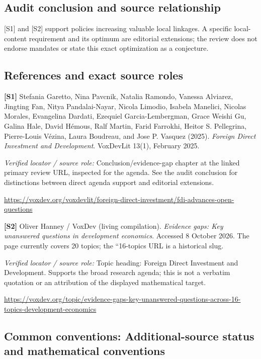 \documentclass[11pt,a4paper]{article}
\begin{document}
\subsection*{Audit conclusion and source relationship}

[S1] and [S2] support policies increasing valuable local linkages. A specific local-content requirement and its optimum are editorial extensions; the review does not endorse mandates or state this exact optimization as a conjecture.

\subsection*{References and exact source roles}

{\footnotesize\raggedright
\par\noindent\textbf{[S1]} Stefania Garetto, Nina Pavcnik, Natalia Ramondo, Vanessa Alviarez, Jingting Fan, Nitya Pandalai-Nayar, Nicola Limodio, Isabela Manelici, Nicolas Morales, Evangelina Dardati, Ezequiel Garcia-Lembergman, Grace Weishi Gu, Galina Hale, David Hémous, Ralf Martin, Farid Farrokhi, Heitor S. Pellegrina, Pierre-Louis Vézina, Laura Boudreau, and Jose P. Vasquez (2025). \emph{Foreign Direct Investment and Development}. VoxDevLit 13(1), February 2025.\par \textit{Verified locator / source role:} Conclusion/evidence-gap chapter at the linked primary review URL, inspected for the agenda. See the audit conclusion for distinctions between direct agenda support and editorial extensions.\par \url{https://voxdev.org/voxdevlit/foreign-direct-investment/fdi-advances-open-questions}\par\smallskip
\par\noindent\textbf{[S2]} Oliver Hanney / VoxDev (living compilation). \emph{Evidence gaps: Key unanswered questions in development economics}. Accessed 8 October 2026. The page currently covers 20 topics; the ``16-topics URL is a historical slug.\par \textit{Verified locator / source role:} Topic heading: Foreign Direct Investment and Development. Supports the broad research agenda; this is not a verbatim quotation or an attribution of the displayed mathematical target.\par \url{https://voxdev.org/topic/evidence-gaps-key-unanswered-questions-across-16-topics-development-economics}\par\smallskip
}

\subsection*{Common conventions: Additional-source status and mathematical conventions}
\end{document}
